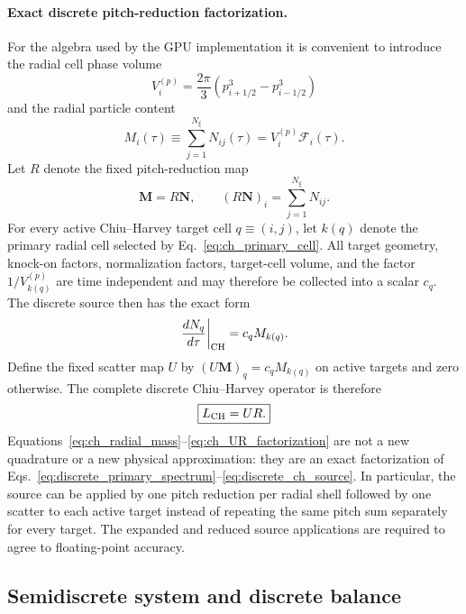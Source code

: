 \documentclass[11pt]{article}
\begin{document}
\paragraph{Exact discrete pitch-reduction factorization.}
For the algebra used by the GPU implementation it is convenient to introduce the radial
cell phase volume
\begin{equation}
 V_i^{(p)}=\frac{2\pi}{3}
 \left(p_{i+1/2}^3-p_{i-1/2}^3\right)
\end{equation}
and the radial particle content
\begin{equation}
 \boxed{
 M_i(\tau)\equiv\sum_{j=1}^{N_\xi}N_{ij}(\tau)
 =V_i^{(p)}\mathcal F_i(\tau).
 }
 \label{eq:ch_radial_mass}
\end{equation}
Let $R$ denote the fixed pitch-reduction map
\begin{equation}
 \bm M=R\bm N,
 \qquad
 (R\bm N)_i=\sum_{j=1}^{N_\xi}N_{ij}.
 \label{eq:ch_reduction_matrix}
\end{equation}
For every active Chiu--Harvey target cell $q\equiv(i,j)$, let $k(q)$ denote the
primary radial cell selected by Eq.~\eqref{eq:ch_primary_cell}.  All target geometry,
knock-on factors, normalization factors, target-cell volume, and the factor
$1/V_{k(q)}^{(p)}$ are time independent and may therefore be collected into a scalar
$c_q$.  The discrete source then has the exact form
\begin{equation}
 \left.\frac{dN_q}{d\tau}\right|_{\rm CH}
 =c_q M_{k(q)}.
 \label{eq:ch_mass_scatter}
\end{equation}
Define the fixed scatter map $U$ by $(U\bm M)_q=c_qM_{k(q)}$ on active targets and
zero otherwise.  The complete discrete Chiu--Harvey operator is therefore
\begin{equation}
 \boxed{L_{\rm CH}=UR.}
 \label{eq:ch_UR_factorization}
\end{equation}
Equations~\eqref{eq:ch_radial_mass}--\eqref{eq:ch_UR_factorization} are not a new
quadrature or a new physical approximation: they are an exact factorization of
Eqs.~\eqref{eq:discrete_primary_spectrum}--\eqref{eq:discrete_ch_source}.  In particular,
the source can be applied by one pitch reduction per radial shell followed by one scatter
to each active target instead of repeating the same pitch sum separately for every target.
The expanded and reduced source applications are required to agree to floating-point
accuracy.

\subsection{Semidiscrete system and discrete balance}
\end{document}
